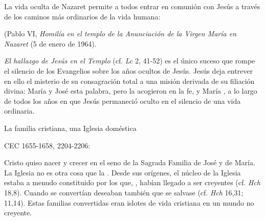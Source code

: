 	 La vida oculta de Nazaret permite a todos entrar en comunión con Jesús a través de los caminos más ordinarios de la vida humana:
	
	 (Pablo VI, \emph{Homilía en el templo de la Anunciación de la Virgen María en Nazaret} (5 de enero de 1964).
	
	 \emph{El hallazgo de Jesús en el Templo} (cf. \emph{Lc} 2, 41-52) es el único suceso que rompe el silencio de los Evangelios sobre los años ocultos de Jesús. Jesús deja entrever en ello el misterio de su consagración total a una misión derivada de su filiación divina:  María y José  esta palabra, pero la acogieron en la fe, y María , a lo largo de todos los años en que Jesús permaneció oculto en el silencio de una vida ordinaria.
	
	La familia cristiana, una Iglesia doméstica
	
	CEC 1655-1658, 2204-2206:
	
	 Cristo quiso nacer y crecer en el seno de la Sagrada Familia de José y de María. La Iglesia no es otra cosa que la . Desde sus orígenes, el núcleo de la Iglesia estaba a menudo constituido por los que, , habían llegado a ser creyentes (cf. \emph{Hch} 18,8). Cuando se convertían deseaban también que se salvase  (cf. \emph{Hch} 16,31; 11,14). Estas familias convertidas eran islotes de vida cristiana en un mundo no creyente.
	
